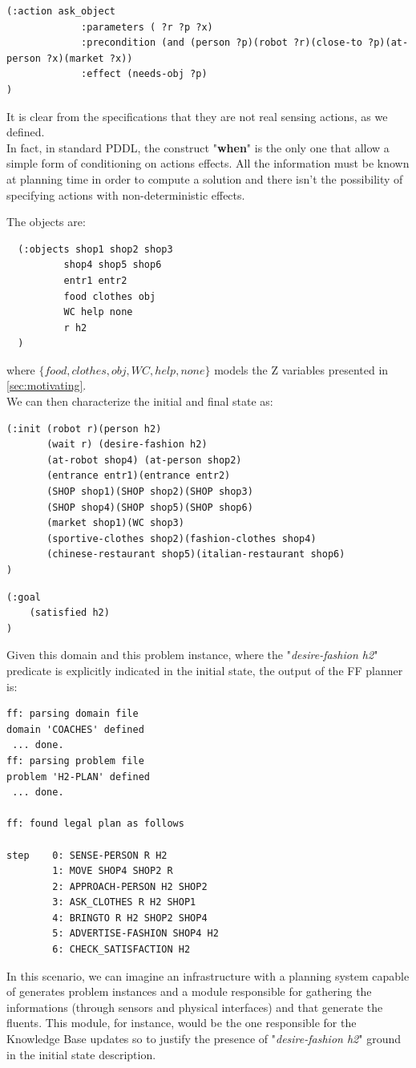 \documentclass[pdftex,12pt,a4paper]{report}
\begin{document}
\begin{verbatim}
(:action ask_object 
             :parameters ( ?r ?p ?x)
             :precondition (and (person ?p)(robot ?r)(close-to ?p)(at-person ?x)(market ?x))
             :effect (needs-obj ?p)
)
\end{verbatim}

\noindent It is clear from the specifications that they are not real sensing actions, as we defined.\\ 
In fact, in standard PDDL, the construct "\textbf{when}" is the only one that allow a simple form of conditioning on actions effects. 
All the information must be known at planning time in order to compute a solution and there isn't the possibility of specifying actions with non-deterministic effects.

\noindent The objects are:
\begin{verbatim}
  (:objects shop1 shop2 shop3
          shop4 shop5 shop6
          entr1 entr2
          food clothes obj
          WC help none
          r h2
  )
\end{verbatim}
\noindent where $\{food, clothes, obj, WC, help, none\}$ models the Z variables presented in \ref{sec:motivating}.\\
\noindent We can then characterize the initial and final state as:
\begin{verbatim}
(:init (robot r)(person h2)
       (wait r) (desire-fashion h2)
	   (at-robot shop4) (at-person shop2)
       (entrance entr1)(entrance entr2)
       (SHOP shop1)(SHOP shop2)(SHOP shop3)
       (SHOP shop4)(SHOP shop5)(SHOP shop6)
       (market shop1)(WC shop3)
       (sportive-clothes shop2)(fashion-clothes shop4)
       (chinese-restaurant shop5)(italian-restaurant shop6)
)
\end{verbatim}

\begin{verbatim}
(:goal
    (satisfied h2)
)
\end{verbatim}
\noindent Given this domain and this problem instance, where the "\textit{desire-fashion h2}" predicate is explicitly indicated in the initial state, the output of the FF planner is:
\begin{verbatim}
ff: parsing domain file
domain 'COACHES' defined
 ... done.
ff: parsing problem file
problem 'H2-PLAN' defined
 ... done.    

ff: found legal plan as follows

step    0: SENSE-PERSON R H2
        1: MOVE SHOP4 SHOP2 R
        2: APPROACH-PERSON H2 SHOP2
        3: ASK_CLOTHES R H2 SHOP1
        4: BRINGTO R H2 SHOP2 SHOP4
        5: ADVERTISE-FASHION SHOP4 H2
        6: CHECK_SATISFACTION H2
\end{verbatim}
\noindent In this scenario, we can imagine an infrastructure with a planning system capable of generates problem instances and a module responsible for gathering the informations (through sensors and physical interfaces) and that generate the fluents. This module, for instance, would be the one responsible for the Knowledge Base updates so to justify the presence of  "\textit{desire-fashion h2}" ground in the initial state description.\\
\end{document}
